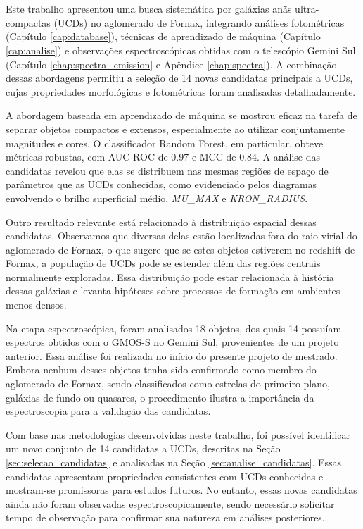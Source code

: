 \chapter{\chapternameconclusions}\label{chap:conclusions}

Este trabalho apresentou uma busca sistemática por galáxias anãs ultra-compactas (UCDs) no aglomerado de Fornax, integrando análises fotométricas (Capítulo \ref{cap:database}), técnicas de aprendizado de máquina (Capítulo \ref{cap:analise}) e observações espectroscópicas obtidas com o telescópio Gemini Sul (Capítulo \ref{chap:spectra_emission} e Apêndice \ref{chap:spectra}). A combinação dessas abordagens permitiu a seleção de 14 novas candidatas principais a UCDs, cujas propriedades morfológicas e fotométricas foram analisadas detalhadamente.

A abordagem baseada em aprendizado de máquina se mostrou eficaz na tarefa de separar objetos compactos e extensos, especialmente ao utilizar conjuntamente magnitudes e cores. O classificador Random Forest, em particular, obteve métricas robustas, com AUC-ROC de 0.97 e MCC de 0.84. A análise das candidatas revelou que elas se distribuem nas mesmas regiões de espaço de parâmetros que as UCDs conhecidas, como evidenciado pelos diagramas envolvendo o brilho superficial médio, \textit{MU\_MAX} e \textit{KRON\_RADIUS}.

Outro resultado relevante está relacionado à distribuição espacial dessas candidatas. Observamos que diversas delas estão localizadas fora do raio virial do aglomerado de Fornax, o que sugere que se estes objetos estiverem no redshift de Fornax, a população de UCDs pode se estender além das regiões centrais normalmente exploradas. Essa distribuição pode estar relacionada à história dessas galáxias e levanta hipóteses sobre processos de formação em ambientes menos densos.

Na etapa espectroscópica, foram analisados 18 objetos, dos quais 14 possuíam espectros obtidos com o GMOS-S no Gemini Sul, provenientes de um projeto anterior. Essa análise foi realizada no início do presente projeto de mestrado. Embora nenhum desses objetos tenha sido confirmado como membro do aglomerado de Fornax, sendo classificados como estrelas do primeiro plano, galáxias de fundo ou quasares, o procedimento ilustra a importância da espectroscopia para a validação das candidatas.

Com base nas metodologias desenvolvidas neste trabalho, foi possível identificar um novo conjunto de 14 candidatas a UCDs, descritas na Seção \ref{sec:selecao_candidatas} e analisadas na Seção \ref{sec:analise_candidatas}. Essas candidatas apresentam propriedades consistentes com UCDs conhecidas e mostram-se promissoras para estudos futuros. No entanto, essas novas candidatas ainda não foram observadas espectroscopicamente, sendo necessário solicitar tempo de observação para confirmar sua natureza em análises posteriores.

